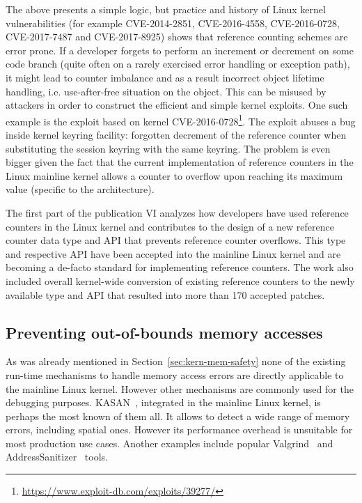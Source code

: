 The above presents a simple logic, but practice and history of Linux kernel vulnerabilities (for example CVE-2014-2851, CVE-2016-4558, CVE-2016-0728, CVE-2017-7487 and CVE-2017-8925) shows that reference counting schemes are error prone. If a developer forgets to perform an increment or decrement on some code branch (quite often on a rarely exercised error handling or exception path), it might lead to counter imbalance and as a result incorrect object lifetime handling, i.e. use-after-free situation on the object. This can be misused by attackers in order to construct the efficient and simple kernel exploits. One such example is the exploit based on kernel CVE-2016-0728\footnote{\url{https://www.exploit-db.com/exploits/39277/}}. The exploit abuses a bug inside kernel keyring facility: forgotten decrement of the reference counter when substituting the session keyring with the same keyring. 
The problem is even bigger given the fact that the current implementation of reference counters in the Linux mainline kernel allows a counter to overflow upon reaching its maximum value (specific to the architecture). 

The first part of the publication VI analyzes how developers have used reference counters in the Linux kernel and contributes to the design of a new reference counter data type  and API that prevents reference counter overflows. This type and respective API have been accepted into the mainline Linux kernel and are becoming a de-facto standard for implementing reference counters. The work also included overall kernel-wide conversion of existing reference counters to the newly available type and API that resulted into more than 170 accepted patches.  

\subsection{Preventing out-of-bounds memory accesses}
\label{sec:kern-mem-out-of-bounds}

As was already mentioned in Section~\ref{sec:kern-mem-safety} none of the existing run-time mechanisms to handle memory access errors are directly applicable to the mainline Linux kernel. However other mechanisms are commonly used for the debugging purposes.
KASAN~\cite{kasan}, integrated in the mainline Linux kernel, is perhaps the most known of them all. It allows to detect a wide range of memory errors, including spatial ones. However its performance overhead is unsuitable for most production use cases.
Another examples include popular Valgrind~\cite{nethercote2007valgrind} and AddressSanitizer~\cite{serebryany2012addresssanitizer} tools. 

